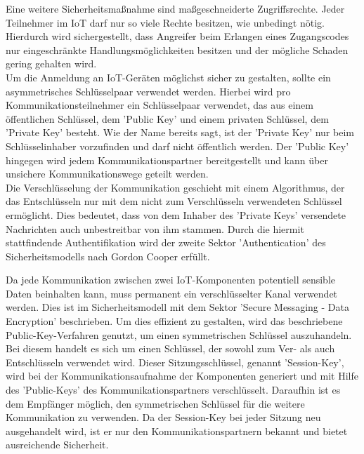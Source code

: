 Eine weitere Sicherheitsmaßnahme sind maßgeschneiderte Zugriffsrechte. Jeder Teilnehmer im \ac{IoT} darf nur so viele Rechte besitzen, wie unbedingt nötig. Hierdurch wird sichergestellt, dass Angreifer beim Erlangen eines Zugangscodes nur eingeschränkte Handlungsmöglichkeiten besitzen und der mögliche Schaden gering gehalten wird.\\

Um die Anmeldung an \ac{IoT}-Geräten möglichst sicher zu gestalten, sollte ein asymmetrisches Schlüsselpaar verwendet werden. Hierbei wird pro Kommunikationsteilnehmer ein Schlüsselpaar verwendet, das aus einem öffentlichen Schlüssel, dem 'Public Key' und einem privaten Schlüssel, dem 'Private Key' besteht. Wie der Name bereits sagt, ist der 'Private Key' nur beim Schlüsselinhaber vorzufinden und darf nicht öffentlich werden. Der 'Public Key' hingegen wird jedem Kommunikationspartner bereitgestellt und kann über unsichere Kommunikationswege geteilt werden.\\

Die Verschlüsselung der Kommunikation geschieht mit einem Algorithmus, der das Entschlüsseln nur mit dem nicht zum Verschlüsseln verwendeten Schlüssel ermöglicht. Dies bedeutet, dass von dem Inhaber des 'Private Keys' versendete Nachrichten auch unbestreitbar von ihm stammen. Durch die hiermit stattfindende Authentifikation wird der zweite Sektor 'Authentication' des Sicherheitsmodells nach Gordon Cooper erfüllt.

Da jede Kommunikation zwischen zwei \ac{IoT}-Komponenten potentiell sensible Daten beinhalten kann, muss permanent ein verschlüsselter Kanal verwendet werden. Dies ist im Sicherheitsmodell mit dem Sektor 'Secure Messaging - Data Encryption' beschrieben. Um dies effizient zu gestalten, wird das beschriebene Public-Key-Verfahren genutzt, um einen symmetrischen Schlüssel auszuhandeln. Bei diesem handelt es sich um einen Schlüssel, der sowohl zum Ver- als auch Entschlüsseln verwendet wird. Dieser Sitzungsschlüssel, genannt 'Session-Key', wird bei der Kommunikationsaufnahme der Komponenten generiert und mit Hilfe des 'Public-Keys' des Kommunikationspartners verschlüsselt. Daraufhin ist es dem Empfänger möglich, den symmetrischen Schlüssel für die weitere Kommunikation zu verwenden. Da der Session-Key bei jeder Sitzung neu ausgehandelt wird, ist er nur den Kommunikationspartnern bekannt und bietet ausreichende Sicherheit.\\
